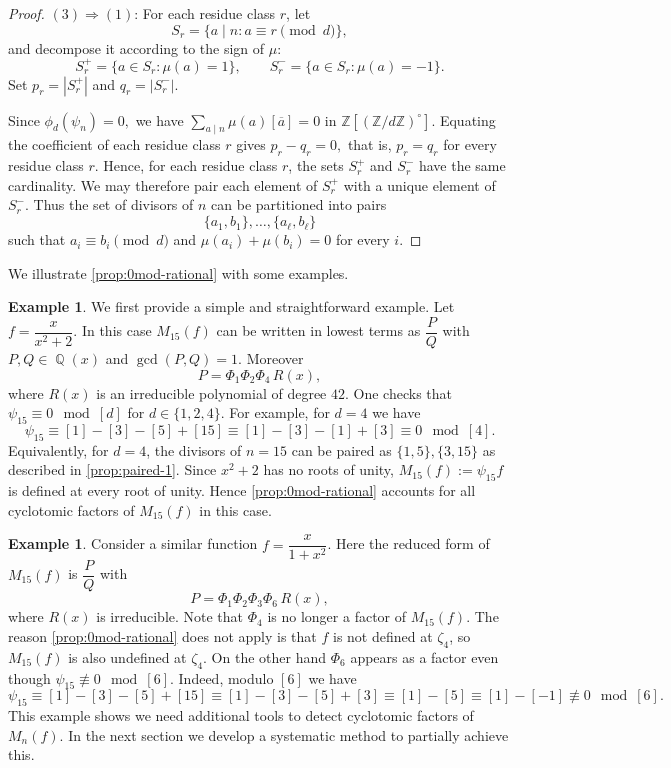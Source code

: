 \documentclass[12t,a4paper]{amsart}
\theoremstyle{definition}
\newtheorem{expl}[thm]{Example}
\DeclareMathOperator{\Q}{\mathbb{Q}}
\numberwithin{equation}{section}
\begin{document}
{\begin{proof}
$(3)\Rightarrow (1)$:     For each residue class $r$, let
\[
S_r=\{a\mid n : a\equiv r\pmod d\},
\]
and decompose it according to the sign of $\mu$:
\[
S_r^{+}=\{a\in S_r : \mu(a)=1\}, 
\qquad
S_r^{-}=\{a\in S_r : \mu(a)=-1\}.
\]
Set $p_r = |S_r^{+}|$ and $q_r = |S_r^{-}|$.  

Since \( \phi_d(\psi_n)=0, \) we have \(  \sum_{a\mid n}\mu(a)[\overline{a}]=0 \) in \(\mathbb Z[(\mathbb Z/d\mathbb Z)^\circ]\). Equating the coefficient of each residue class \(r\) gives \(  p_r-q_r=0, \) that is, \( p_r=q_r \) for every residue class \(r\). 
Hence, for each residue class \(r\), the sets \(S_r^+\) and \(S_r^-\) have the same cardinality. We may therefore pair each element of \(S_r^+\) with a unique element of \(S_r^-\). 
Thus the set of divisors of \(n\) can be partitioned into pairs \[ \{a_1,b_1\},\ldots,\{a_\ell,b_\ell\} \] such that \( a_i\equiv b_i \pmod d \) and \( \mu(a_i)+\mu(b_i)=0 \) for every \(i\). 
\end{proof}



We illustrate \cref{prop:0mod-rational} with some examples.

\begin{expl}
We first provide a simple and straightforward example. Let $f=\dfrac{x}{x^2+2}.$ In this case $M_{15}(f)$ can be written in lowest terms as $\dfrac{P}{Q}$ with $P,Q\in\Q(x)$ and $\gcd(P,Q)=1.$ Moreover
\[
P=\Phi_1\Phi_2\Phi_4\,R(x),
\]
where $R(x)$ is an irreducible polynomial of degree $42.$ One checks that $\psi_{15}\equiv 0\mod [d]$ for $d\in\{1,2,4\}$. For example, for $d=4$ we have 
\[ \psi_{15} \equiv [1]-[3]-[5]+[15] \equiv [1]-[3]-[1]+[3] \equiv 0 \mod{[4]}.\]
{Equivalently, for $d=4$, the divisors of $n=15$ can be paired as $\{1, 5\}, \{3, 15\}$ as described in \cref{prop:paired-1}. }
Since $x^2+2$ has no roots of unity, $M_{15}(f):=\psi_{15}f$ is defined at every root of unity. Hence \cref{prop:0mod-rational} accounts for all cyclotomic factors of $M_{15}(f)$ in this case.
\end{expl}

\begin{expl} \label{exp:additional-root}
Consider a similar function $f=\dfrac{x}{1+x^2}$. Here the reduced form of $M_{15}(f)$ is $\dfrac{P}{Q}$ with
\[
P=\Phi_1\Phi_2\Phi_3\Phi_6\,R(x),
\]
where $R(x)$ is irreducible. Note that $\Phi_4$ is no longer a factor of $M_{15}(f)$. The reason \cref{prop:0mod-rational} does not apply is that $f$ is not defined at $\zeta_4$, so $M_{15}(f)$ is also undefined at $\zeta_4$. On the other hand $\Phi_6$ appears as a factor even though $\psi_{15}\not\equiv 0\mod{[6]}$. Indeed, modulo $[6]$ we have
\[
\psi_{15}\equiv[1]-[3]-[5]+[15]\equiv[1]-[3]-[5]+[3]\equiv[1]-[5]\equiv[1]-[-1] \not \equiv 0\mod{[6]}.
\]
This example shows we need additional tools to detect cyclotomic factors of $M_n(f)$. In the next section we develop a systematic method to partially achieve this.
\end{expl}


}
\end{document}
